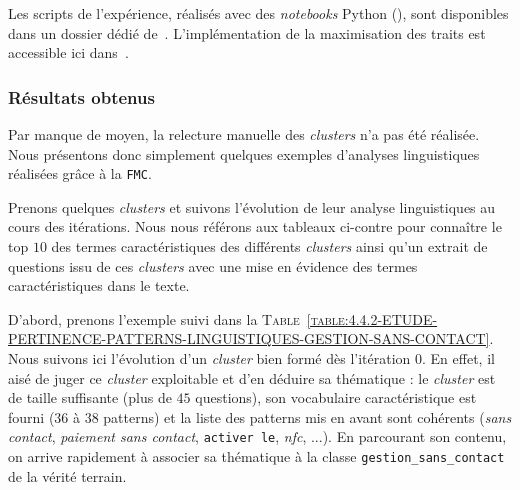 			\begin{leftBarInformation}
				Les scripts de l'expérience, réalisés avec des \textit{notebooks} Python (\cite{van-rossum-drake:2009:python-reference-manual}), sont disponibles dans un dossier dédié de~\cite{schild:2021:cognitivefactory-interactiveclusteringcomparativestudy}.
				L'implémentation de la maximisation des traits est accessible ici dans~\cite{schild:2023:cognitivefactory-featuresmaximizationmetric}.
			\end{leftBarInformation}

		\subsubsection{Résultats obtenus}
			
			\begin{leftBarWarning}
				Par manque de moyen, la relecture manuelle des \textit{clusters} n'a pas été réalisée.
				Nous présentons donc simplement quelques exemples d'analyses linguistiques réalisées grâce à la \texttt{FMC}.
			\end{leftBarWarning}
			
			Prenons quelques \textit{clusters} et suivons l'évolution de leur analyse linguistiques au cours des itérations.
			Nous nous référons aux tableaux ci-contre pour connaître le top $10$ des termes caractéristiques des différents \textit{clusters} ainsi qu'un extrait de questions issu de ces \textit{clusters} avec une mise en évidence des termes caractéristiques dans le texte.
			
			D'abord, prenons l'exemple suivi dans la \textsc{Table~\ref{table:4.4.2-ETUDE-PERTINENCE-PATTERNS-LINGUISTIQUES-GESTION-SANS-CONTACT}}.
			Nous suivons ici l'évolution d'un \textit{cluster} bien formé dès l'itération $0$.
			En effet, il aisé de juger ce \textit{cluster} exploitable et d'en déduire sa thématique : le \textit{cluster} est de taille suffisante (plus de $45$ questions), son vocabulaire caractéristique est fourni ($36$ à $38$ patterns) et la liste des patterns mis en avant sont cohérents (\textit{sans contact}, \textit{paiement sans contact}, \texttt{activer le}, \textit{nfc}, ...).
			En parcourant son contenu, on arrive rapidement à associer sa thématique à la classe \texttt{gestion\_sans\_contact} de la vérité terrain.
			

